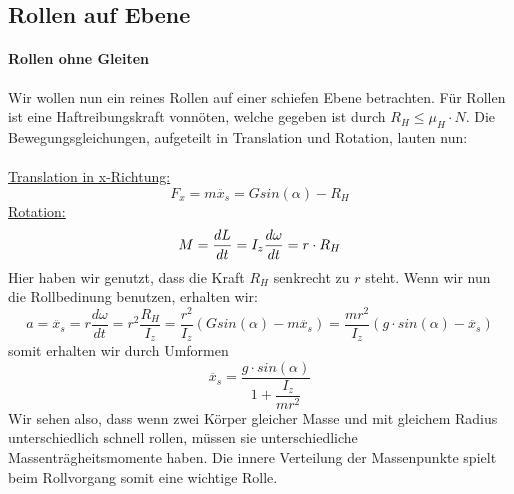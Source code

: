 \documentclass[12pt]{article}
\begin{document}
\subsection{Rollen auf Ebene}
\begin{figure}[H]
  \label{fig:1teil}
\end{figure} 

\paragraph{Rollen ohne Gleiten} Wir wollen nun ein reines Rollen auf einer schiefen Ebene betrachten. Für Rollen ist eine Haftreibungskraft vonnöten, welche gegeben ist durch $R_H \leq \mu_H \cdot N$. Die Bewegungsgleichungen, aufgeteilt in Translation und Rotation, lauten nun: \\\\
\underline{Translation in x-Richtung:}
\begin{equation}
F_x = m \ddot{x_s} = Gsin(\alpha) - R_H
\end{equation}
\underline{Rotation:}
\begin{equation}
M = \dfrac{dL}{dt} = I_z \dfrac{d \omega}{dt} = r \cdot R_H \\\\
\end{equation}
Hier haben wir genutzt, dass die Kraft $R_H$ senkrecht zu $r$ steht. Wenn wir nun die Rollbedinung benutzen, erhalten wir:
\begin{equation}
a = \ddot{x_s} = r \dfrac{d \omega}{dt} = r^2 \dfrac{R_H}{I_z} = \dfrac{r^2}{I_z} (G sin(\alpha) - m \ddot{x_s}) = \dfrac{m r^2}{I_z} (g \cdot sin(\alpha) - \ddot{x_s})
\end{equation}
somit erhalten wir durch Umformen
\begin{equation}
\ddot{x_s} = \dfrac{g \cdot sin(\alpha)}{1 + \dfrac{I_z}{mr^2}}
\end{equation}
Wir sehen also, dass wenn zwei Körper gleicher Masse und mit gleichem Radius unterschiedlich schnell rollen, müssen sie unterschiedliche Massenträgheitsmomente haben.  Die innere Verteilung der Massenpunkte spielt beim Rollvorgang somit eine wichtige Rolle.
\end{document}
